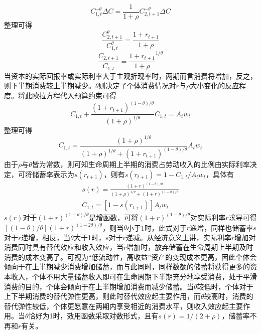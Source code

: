 \documentclass[supercite]{HustGraduPaper}
\begin{document}
    \begin{equation}
    C_{1,t}^{-\theta}\Delta C=\frac{1}{1+\rho}C_{2,t+1}^{-\theta}\Delta C
    \end{equation}
    整理可得
    \begin{equation}
    \frac{C_{2,t+1}^\theta}{C_{1,t}^\theta}=\frac{1+r_{t+1}}{1+\rho}
    \end{equation}
    \begin{equation}
    \frac{C_{2,t+1}}{C_{1,t}}=\frac{1+r_{t+1}}{1+\rho}^{1/\theta}
    \end{equation}
    当资本的实际回报率或实际利率大于主观折现率时，两期而言消费将增加，反之，则下半期消费较上半期减少。$\theta$则决定了个体消费情况对$r$与$\rho$大小变化的反应程度。将此欧拉方程代入预算约束可得
    \begin{equation}
    C_{1,t}+\frac{(1+r_{t+1})^{(1-\theta)/\theta}}{(1+\rho)^{1/\theta}}C_{1,t}=A_tw_t
    \end{equation}
    整理可得
    \begin{equation}
    C_{1,t}=\frac{(1+\rho)^{1/\theta}}{(1+\rho)^{1/\theta}+(1+r_{t+1})^{(1-\theta)/\theta}}A_tw_t
    \end{equation}
    由于$\rho$与$\theta$皆为常数，则可知生命周期上半期的消费占劳动收入的比例由实际利率决定，可将储蓄率表示为$s(r_{t+1})$，则有$s(r_{t+1})=1-C_{1,t}/A_tw_t$，具体有
    \begin{equation}
    \begin{aligned}
    s(r)=\frac{(1+r)^{(1-\theta)/\theta}}{(1+\rho)^{1/\theta}+(1+r)^{(1-\theta)/\theta}}\\
    C_{1,t}=[1-s(r_{t+1})]A_tw_t
    \end{aligned}
    \end{equation}
    $s(r)$对于$(1+r)^{(1-\theta)/\theta}$是增函数，可将$(1+r)^{(1-\theta)/\theta}$对实际利率$r$求导可得$[(1-\theta)/\theta](1+r)^{(1-2\theta)/\theta}$，则当$\theta$小于1时，此式对于$r$递增，同样也储蓄率$s$对于$r$递增，相反，当$\theta$大于1时，$s$对于$r$递减。从经济意义上讲，实际利率$r$增加对消费同时具有替代效应和收入效应，当$r$增加时，放弃储蓄在生命周期上半期及时消费的成本变高了。可视为“低流动性，高收益”资产的变现成本更高，因此个体会倾向于在上半期减少消费增加储蓄，而与此同时，同样数额的储蓄将获得更多的资本收入，个体不用大量储蓄收入即可在生命周期下半期充分地享受消费，处于平滑消费的目的，个体会倾向于在上半期增加消费而减少储蓄。当$\theta$较低时，个体对于上下半期消费的替代弹性更高，则此时替代效应起主要作用，而$\theta$较高时，消费的替代弹性较低，个体更愿意在两期内享受相近的消费水平，则收入效应起主要作用。当$\theta$恰好为1时，效用函数采取对数形式，且有$s(r)=1/(2+\rho)$，储蓄率不再和$r$有关。
\end{document}
